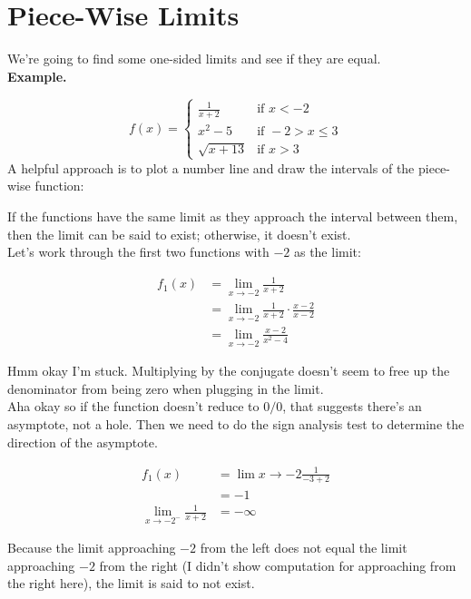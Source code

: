 \documentclass{article}
\begin{document}
\section{Piece-Wise Limits}

We're going to find some one-sided limits and see if they are equal. \\

\textbf{Example.}

$$
f(x) = \begin{cases}
    \frac{1}{x+2} & \text{if } x < -2\\
    x^2 - 5 & \text{if } -2 > x \leq 3\\
    \sqrt{x+13} & \text{if } x > 3
\end{cases}
$$
A helpful approach is to plot a number line and draw the intervals of the piece-wise
function:\\


If the functions have the same limit as they approach the interval between them, then the
limit can be said to exist; otherwise, it doesn't exist.\\

Let's work through the first two functions with $-2$ as the limit:

\begin{align*}
    f_1(x) &= \lim_{x \to -2} \frac{1}{x + 2}\\
           &= \lim_{x\to -2} \frac{1}{x+2} \cdot \frac{x-2}{x-2}\\
           &= \lim_{x\to -2} \frac{x-2}{x^2-4}
\end{align*}

Hmm okay I'm stuck. Multiplying by the conjugate doesn't seem to free up the denominator
from being zero when plugging in the limit.\\

Aha okay so if the function doesn't reduce to $0/0$, that suggests there's an asymptote,
not a hole. Then we need to do the sign analysis test to determine the direction of the
asymptote.

\begin{align*}
    f_1(x) &= \lim{x\to -2} \frac{1}{-3+2}\\
           &= -1\\
    \lim_{x\to -2^-} \frac{1}{x + 2} &= -\infty
\end{align*}

Because the limit approaching $-2$ from the left does not equal the limit approaching $-2$
from the right (I didn't show computation for approaching from the right here), the limit
is said to not exist.
\end{document}
